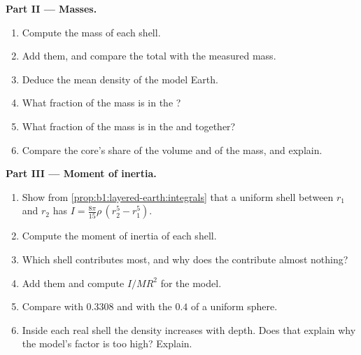 \begin{problem}
\noindent\textbf{Part II --- Masses.}
\begin{enumerate}[resume]
  \item Compute the mass of each shell.
  \item Add them, and compare the total with the measured mass.
  \item Deduce the mean density of the model Earth.
  \item What fraction of the mass is in the ?
  \item What fraction of the mass is in the  and  together?
  \item Compare the core's share of the volume and of the mass, and explain.
\end{enumerate}

\noindent\textbf{Part III --- Moment of inertia.}
\begin{enumerate}[resume]
  \item Show from \cref{prop:b1:layered-earth:integrals} that a uniform shell
        between $r_1$ and $r_2$ has $I = \tfrac{8\pi}{15}\rho\,(r_2^5 - r_1^5)$.
  \item Compute the moment of inertia of each shell.
  \item Which shell contributes most, and why does the  contribute
        almost nothing?
  \item Add them and compute $I/MR^2$ for the model.
  \item Compare with $0.3308$ and with the $0.4$ of a uniform sphere.
  \item Inside each real shell the density increases with depth. Does that
        explain why the model's factor is too high? Explain.
\end{enumerate}


\end{problem}
